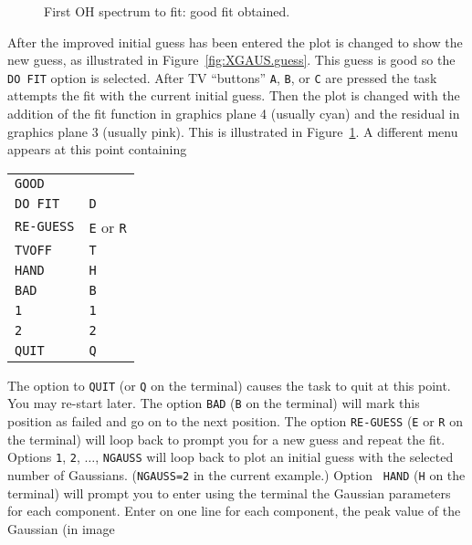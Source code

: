 \documentclass[twoside]{article}
\newcommand{\putfig}[1]{\texttt{[image: \#1.eps]}}
\begin{document}
\begin{figure}
\begin{center}
\resizebox{6.0in}{!}{\putfig{XGAUS.good}}
\caption{First OH spectrum to fit: good fit obtained.}
\label{fig:XGAUS.good}
\end{center}
\end{figure}

After the improved initial guess has been entered the plot is changed
to show the new guess, as illustrated in Figure~\ref{fig:XGAUS.guess}.
This guess is good so the {\tt DO FIT} option is selected.  After TV
``buttons'' {\tt A}, {\tt B}, or {\tt C} are pressed the task attempts
the fit with the current initial guess.  Then the plot is changed with
the addition of the fit function in graphics plane 4 (usually cyan)
and the residual in graphics plane 3 (usually pink).  This is
illustrated in Figure~\ref{fig:XGAUS.good}.  A different menu appears
at this point containing\\
\begin{center}
\begin{tabular}{|l|l|}\hline
   {\tt GOOD}     & {\tt \hphantom{A}} \\
   {\tt DO FIT}   & {\tt D} \\
   {\tt RE-GUESS} & {\tt E} or {\tt R} \\
   {\tt TVOFF}    & {\tt T} \\
   {\tt HAND}     & {\tt H} \\
   {\tt BAD}      & {\tt B} \\
   {\tt 1}        & {\tt 1} \\
   {\tt 2}        & {\tt 2} \\
   {\tt QUIT}     & {\tt Q} \\ \hline
\end{tabular}
\end{center}
The option to {\tt QUIT} (or {\tt Q} on the terminal) causes the task
to quit at this point.  You may re-start later.  The option {\tt BAD}
({\tt B} on the terminal) will mark this position as failed and go on
to the next position.   The option {\tt RE-GUESS} ({\tt E} or {\tt R}
on the terminal) will loop back to prompt you for a new guess and
repeat the fit.  Options {\tt 1}, {\tt 2}, $\ldots$, {\tt NGAUSS} will
loop back to plot an initial guess with the selected number of
Gaussians.  ({\tt NGAUSS=2} in the current example.)  Option {\tt
  HAND} ({\tt H} on the terminal) will prompt you to enter using the
terminal the Gaussian parameters for each component.  Enter on one
line for each component, the peak value of the Gaussian (in image
\end{document}

